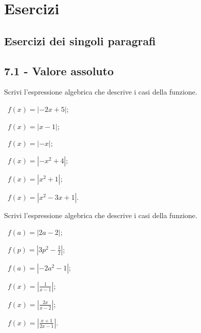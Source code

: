 \section{Esercizi}
\subsection{Esercizi dei singoli paragrafi}
\subsection*{7.1 - Valore assoluto}

\begin{esercizio}
 \label{ese:7.1}
Scrivi l'espressione algebrica che descrive i casi della funzione.
\begin{multicols}{3}
 \begin{enumeratea}
 \item~$ f(x)=\left|-2x+5\right| $;
 \item~$ f(x)=\left|x-1\right| $;
 \item~$ f(x)=\left|-x\right| $;
 \item~$ f(x)=\left|-x^2+4\right| $;
 \item~$ f(x)=\left|x^2+1\right| $;
 \item~$ f(x)=\left|x^2-3x+1\right| $.
 \end{enumeratea}
 \end{multicols}
\end{esercizio}

\begin{esercizio}
 \label{ese:7.2}
Scrivi l'espressione algebrica che descrive i casi della funzione.
\begin{multicols}{3}
 \begin{enumeratea}
 \item~$ f(a)=\left|2a-2\right| $;
 \item~$ f(p)=\left|3p^2-\frac 1 2\right| $;
 \item~$ f(a)=\left|-2a^2-1\right| $;
 \item~$ f(x)=\left|\frac 1{x-1}\right| $;
 \item~$ f(x)=\left|\frac{2x}{x-2}\right| $;
 \item~$ f(x)=\left|\frac{x+1}{2x-1}\right| $.
 \end{enumeratea}
 \end{multicols}
\end{esercizio}

